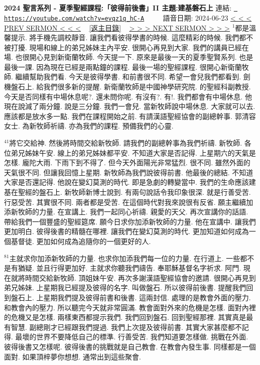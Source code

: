 \documentclass{book}
\begin{document}
\section{}
\label{sec:evqz1q_hC_A}
\textbf{2024 聖言系列 - 夏季聖經課程:「彼得前後書」II 主題:建基磐石上}
\newline
\newline
連結: \href{https://youtube.com/watch?v=evqz1q_hC-A}{\texttt{ https://youtube.com/watch?v=evqz1q\_hC-A}} ~~~~ 語音日期: 2024-06-23 
\newline
\newline
\hyperref[sec:wAbpGBqNgNM]{\small{< < < PREV SERMON < < <}}
~
\hyperref[sec:index]{\small{[返主目錄]}}
~
\hyperref[sec:BQvEiworls4]{\small{> > > NEXT SERMON > > >}}
\newline
\newline
$^{1}$都是溫馨提示.
將手機先調校靜音.
讓我們看彼得學書的時候.
這麼精彩的時候.
我們都不被打擾.
現場和線上的弟兄姊妹主內平安.
很開心再見到大家.
我們的講員已經在場.
也很開心見到新衛蘭牧師.
今天提一下.
原來是最後一天的夏季聖賢系列.
也是最後一課.
因為現在已經是兩點鐘的課程.
最後一場的聖經課程.
很開心新衛蘭牧師.
繼續幫助我們看.
今天是彼得學書.
和前書很不同.
希望一會兒我們都看到.
劍機盤石上.
給我們很多新的提醒.
新衛蘭牧師是中國神學研究院.
的聖經科副教授.
今天是否同樣有中場休息呢?.
還未問你呢.
有沒有?.
有!.
我們都會有中場休息.
他現在說減了兩分鐘.
說是三分鐘.
我們一會兒.
當新牧師說中場休息.
大家就可以去.
應該都是放水多一點.
我們在課程開始之前.
有請漢語聖經協會的副總幹事.
郭清容女士.
為新牧師祈禱.
亦為我們的課程.
預備我們的心靈.

$^{41}$將它交給神.
然後將時間交給新牧師.
請我們的副總幹事為我們祈禱.
新牧師.
各位弟兄姊妹午安.
線上的弟兄姊妹都平安.
不知道大家是否記得.
上星期六的天氣是怎樣.
龐陀大雨.
下雨下到不得了.
但今天外面陽光非常猛烈.
很不同.
雖然外面的天氣很不同.
但讓我回憶上星期.
新牧師為我們說彼得前書.
他最後的總結.
不知道大家是否還記得.
他說在變幻莫測的時代.
即是急劇的轉變當中.
我們的生命應該建基在聖經的盤石上.
新牧師新博士說到.
有兩句說話令我印象很深.
就是行善受苦.
行惡受苦.
其實很不同.
兩者都是受苦.
在這個時代對我來說很有反省.
願主繼續加添新牧師的力量.
在宣講上.
我們一起同心祈禱.
親愛的天父.
再次宣講你的話語.
帶給我們一個豐盛的聖經筵席.
願今日求你加添新牧師的力量.
他在宣講中.
讓我們更加明白.
彼得後書的精髓在哪裡.
讓我們在變幻莫測的時代.
更加知道如何成為一個基督徒.
更加如何成為追隨你的一個更好的人.

$^{81}$主就求你加添新牧師的力量.
也求你加添我們每一位的力量.
在行道上.
一些都不是有猶疑.
並且行得更加好.
主就求你聽我們禱告.
奉耶穌基督名字祈求.
阿門.
現在就將時間交給新牧師.
頂姐妹午安.
再次多謝漢語聖經協會的邀請.
很開心再見到弟兄姊妹.
上星期我已經提及彼得的名字.
叫做盤石.
所以彼得前後書.
提醒我們回到盤石上.
上星期我們提及彼得前書和後書.
這兩封信.
處理的是教會外面的壓力.
和教會內的壓力.
所以聽完今天就非常圓滿.
教會面對外來的危機是怎樣.
面對內裡的危機又是怎樣.
兩樣東西都提示我們.
我們回到盤石.
回到聖經那裡.
其實真是最有智慧.
副總剛才已經跟我們提過.
我們上次提及彼得前書.
其實大家甚麼都不記得.
最壞的世界不要降低自己的標準.
行善受苦.
我們知道要怎樣做.
挑戰在外面.
彼得後書又怎樣呢.
彼得後書的挑戰就是自己教會.
在教會內發生事.
同樣都是一個面對.
如果頂梓夢你想想.
通常出到這些聚會.
\end{document}
